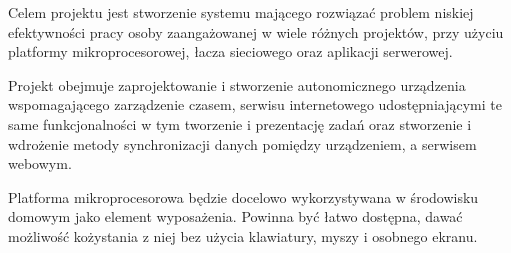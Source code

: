 Celem projektu jest stworzenie systemu mającego rozwiązać problem niskiej efektywności pracy osoby zaangażowanej w wiele różnych projektów, przy użyciu platformy mikroprocesorowej, łacza sieciowego oraz aplikacji serwerowej.

Projekt obejmuje zaprojektowanie i stworzenie autonomicznego urządzenia wspomagającego zarządzenie czasem, serwisu internetowego udostępniającymi te same funkcjonalności w tym tworzenie i prezentację zadań oraz stworzenie i wdrożenie metody synchronizacji danych pomiędzy urządzeniem, a serwisem webowym.

Platforma mikroprocesorowa będzie docelowo wykorzystywana w środowisku domowym jako element wyposażenia. Powinna być łatwo dostępna, dawać możliwość kożystania z niej bez użycia klawiatury, myszy i osobnego ekranu.
